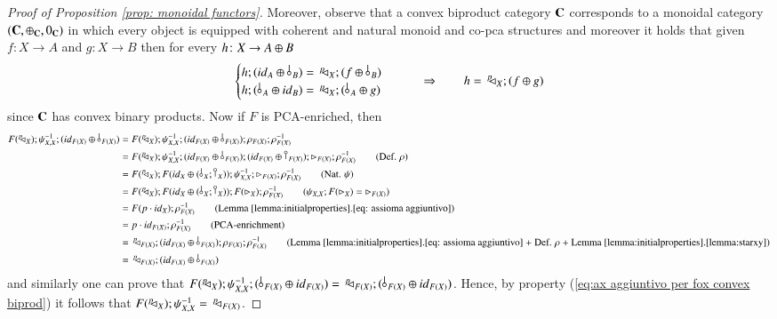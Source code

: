\begin{proof}[Proof of Proposition \ref{prop: monoidal functors}]
    Moreover, observe that a convex biproduct category $\mathbf{C}$ corresponds to a monoidal category 
    $(\mathbf{C},\oplus_{\mathbf{C}},0_{\mathbf{C}})$ in which every object is equipped with coherent and natural monoid and co-pca structures and moreover it holds that given $f:X\to A$ and $g:X\to B$ then for every $h\colon X\to A\oplus B$
    \begin{equation}\label{eq:ax aggiuntivo per fox convex biprod}
         \begin{cases}
    h;(\id{A}\piu\, \bangp{B})=\, \diagp{X};(f\piu \,\bangp{B})\\
    h;(\,\bangp{A}\piu \id{B})=\,\diagp{X};(\,\bangp{A}\piu g)
\end{cases}
\qquad
\Rightarrow 
\qquad 
h=\,\diagp{X};(f\piu g)
    \end{equation}
    since $\mathbf{C}$ has convex binary products.
    Now if $F$ is PCA-enriched, then 
    \begin{align}
        F(\diagp{X});\psi_{X,X}^{-1};(\id{F(X)}\piu\, \bangp{F(X)})&=F(\diagp{X});\psi_{X,X}^{-1};(\id{F(X)}\piu\, \bangp{F(X)}); \rho_{F(X)};\rho^{-1}_{F(X)} \tag*{}\\
        &=F(\diagp{X});\psi_{X,X}^{-1};(\id{F(X)}\piu\, \bangp{F(X)}); (\id{F(X)}\piu \cobang{F(X)});\codiag{F(X)};\rho_{F(X)}^{-1} \tag{Def. $\rho$}\\
        &=F(\diagp{X});F(\id{X}\piu (\,\bangp{X};\cobang{X})); \psi_{X,X}^{-1};\codiag{F(X)};\rho^{-1}_{F(X)}\tag{Nat. $\psi$}\\
        &=F(\diagp{X});F(\id{X}\piu (\,\bangp{X};\cobang{X}));F(\codiag{X});\rho^{-1}_{F(X)} \tag{$\psi_{X,X};F(\codiag{X})= \codiag{F(X)} $}\\
        &= F(p\cdot \id{X});\rho^{-1}_{F(X)}  \tag{Lemma \ref{lemma:initialproperties}.\ref{eq: assioma aggiuntivo}}\\
        &= p\cdot \id{F(X)};\rho^{-1}_{F(X)}\tag{PCA-enrichment}\\
        &=\, \diagp{F(X)};(\id{F(X)}\piu\,\bangp{F(X)});\rho_{F(X)};\rho^{-1}_{F(X)}\tag{Lemma \ref{lemma:initialproperties}.\ref{eq: assioma aggiuntivo} + Def. $\rho$ + Lemma \ref{lemma:initialproperties}.\ref{lemma:starxy}}\\
        &=\, \diagp{F(X)};(\id{F(X)}\piu\,\bangp{F(X)}) \tag*{}
    \end{align}
and similarly one can prove that $F(\diagp{X});\psi_{X,X}^{-1};(\,\bangp{F(X)}\piu\id{F(X)})= \, \diagp{F(X)};(\,\bangp{F(X)}\piu \id{F(X)})$. Hence, by property (\ref{eq:ax aggiuntivo per fox convex biprod}) it follows that $F(^p\!\! \lhd_{X});\psi_{X,X}^{-1}=\, ^p\!\! \lhd_{F(X)}$.

\end{proof}

